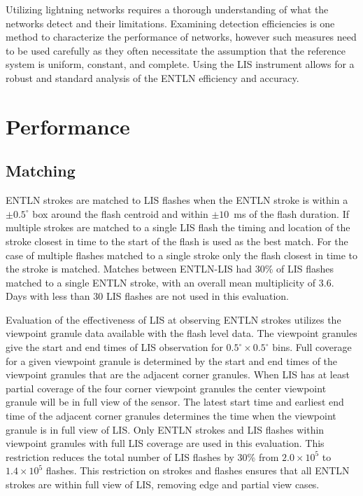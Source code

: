 Utilizing lightning networks requires a thorough understanding of what the networks detect and their limitations.
Examining detection efficiencies is one method to characterize the performance of networks, however such measures need to be used carefully as they often necessitate the assumption that the reference system is uniform, constant, and complete.
Using the LIS instrument allows for a robust and standard analysis of the ENTLN efficiency and accuracy.

\section{Performance}

\subsection{Matching}

ENTLN strokes are matched to LIS flashes when the ENTLN stroke is within a $\pm0.5^\circ$ box around the flash centroid and within $\pm10$~ms of the flash duration.
If multiple strokes are matched to a single LIS flash the timing and location of the stroke closest in time to the start of the flash is used as the best match.
For the case of multiple flashes matched to a single stroke only the flash closest in time to the stroke is matched.
Matches between ENTLN-LIS had 30\% of LIS flashes matched to a single ENTLN stroke, with an overall mean multiplicity of 3.6.
Days with less than 30 LIS flashes are not used in this evaluation.

Evaluation of the effectiveness of LIS at observing ENTLN strokes utilizes the viewpoint granule data available with the flash level data.
The viewpoint granules give the start and end times of LIS observation for $0.5^\circ \times 0.5^\circ$ bins.
Full coverage for a given viewpoint granule is determined by the start and end times of the viewpoint granules that are the adjacent corner granules.
When LIS has at least partial coverage of the four corner viewpoint granules the center viewpoint granule will be in full view of the sensor.
The latest start time and earliest end time of the adjacent corner granules determines the time when the viewpoint granule is in full view of LIS.
Only ENTLN strokes and LIS flashes within viewpoint granules with full LIS coverage are used in this evaluation.
This restriction reduces the total number of LIS flashes by 30\% from $2.0 \times 10^5$ to $1.4 \times 10^5$ flashes.
This restriction on strokes and flashes ensures that all ENTLN strokes are within full view of LIS, removing edge and partial view cases.

